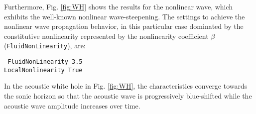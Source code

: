 Furthermore, Fig. \ref{fig:WH} shows the results for the nonlinear wave, which exhibits the well-known nonlinear wave-steepening. The settings to achieve the nonlinear wave propagation behavior, in this particular case dominated by the constitutive nonlinearity represented by the nonlinearity coefficient $\beta$ ({\tt FluidNonLinearity}), are:

    {\tt
        FluidNonLinearity 3.5 \\
        LocalNonlinearity True
    }

In the acoustic white hole in Fig. \ref{fig:WH}, the characteristics converge towards the sonic horizon so that the acoustic wave is progressively blue-shifted while the acoustic wave amplitude increases over time.

\begin{figure*}
    \caption{Example of an acoustic black hole.}
    \label{fig:BH}
\end{figure*}


\begin{figure*}
    \caption{Example of an acoustic white hole.}
    \label{fig:WH}
\end{figure*}



